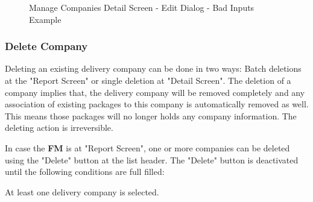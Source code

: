 \begin{figure}[H]
	\centering
    \vspace{5pt}
    \hspace{5pt}
    \caption{Manage Companies Detail Screen - Edit Dialog - Bad Inputs Example}
	\label{fig:MCDetailEditDlgBad}
\end{figure}

\subsubsection{Delete Company}

Deleting an existing delivery company can be done in two ways: Batch deletions at the "Report Screen" or single deletion at "Detail Screen". The deletion of a company implies that, the delivery company will be removed completely and any association of existing packages to this company is automatically removed as well. This means those packages will no longer holds any company information. The deleting action is irreversible. 

In case the \textbf{FM} is at "Report Screen", one or more companies can be deleted using the "Delete" button at the list header. The "Delete" button is deactivated until the following conditions are full filled:

\begin{compactenum}
    \item At least one delivery company is selected.
\end{compactenum}

